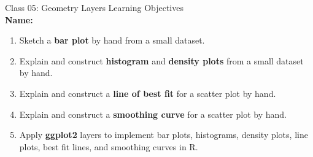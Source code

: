 \documentclass[11pt]{article}
\begin{document}
{\Large \textcolor{oiB}{
Class 05: Geometry Layers
\hfill Learning Objectives}} \\

\textbf{Name:} \underline{\hspace{6cm}} \\

\vspace{0.2cm}

\begin{enumerate}
\renewcommand\labelenumi{\textcolor{light}{\textbf{LO \theenumi.}}}

\item Sketch a \textbf{bar plot} by hand from a small dataset.

\item Explain and construct \textbf{histogram} and \textbf{density plots} from
a small dataset by hand.

\item Explain and construct a \textbf{line of best fit} for a scatter plot by
hand.

\item Explain and construct a \textbf{smoothing curve} for a scatter plot by
hand.

\item Apply \textbf{ggplot2} layers to implement bar plots, histograms, 
density plots, line plots, best fit lines, and smoothing curves in R.

\end{enumerate}

\noindent\makebox[\linewidth]{\rule{1.1\textwidth}{0.4pt}}
\end{document}
